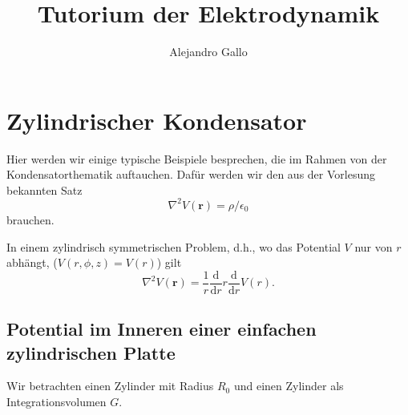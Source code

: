 \documentclass[A4paper, 12pt]{amsart}
\title{Tutorium der Elektrodynamik}
\author{Alejandro Gallo}
\begin{document}
\maketitle
\tableofcontents

\section{Zylindrischer Kondensator}
Hier werden wir einige typische Beispiele
besprechen, die im Rahmen von der Kondensatorthematik
auftauchen.
Dafür werden wir den aus der Vorlesung bekannten Satz
%
\begin{equation}
  \label{eq:gauss_theorem}
  \nabla ^{2} V(\mathbf{r}) = \rho / \epsilon_{0}
\end{equation}
%
brauchen.

In einem zylindrisch symmetrischen Problem, d.h., wo das Potential
$ V $ nur von $ r $ abhängt, ($ V(r, \phi, z) = V(r) $) gilt
%
\begin{equation}
  \label{eq:laplacian_in_cylindrical_coordinates}
  \nabla ^{2} V(\mathbf{r}) =
  \frac{1}{r}
  \frac{\mathrm{d}}{\mathrm{d}r}
  r
  \frac{\mathrm{d}}{\mathrm{d}r}
  V(r)
  .
\end{equation}
%

\newpage
\subsection{Potential im Inneren einer einfachen zylindrischen Platte}

Wir betrachten einen Zylinder mit Radius $ R_{0} $ und einen
Zylinder als Integrationsvolumen $ G $.

\begin{center}
  
\end{center}
\end{document}
